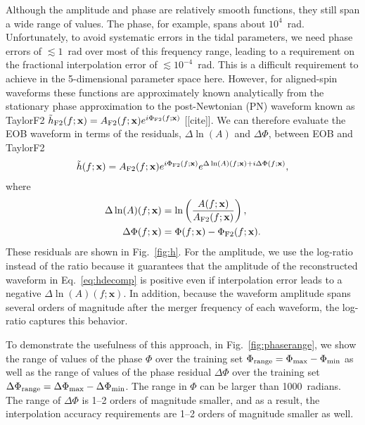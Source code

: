 \documentclass[prd,aps,letter,twocolumn,floatfix,notitlepage,nofootinbib]{revtex4-1}
\def\bx{\mathbf{x}}
\begin{document}
Although the amplitude and phase are relatively smooth functions, they still span a wide range of values. The phase, for example, spans about $10^4$~rad. Unfortunately, to avoid systematic errors in the tidal parameters, we need phase errors of $\lesssim 1$~rad over most of this frequency range, leading to a requirement on the fractional interpolation error of $\lesssim 10^{-4}$~rad. This is a difficult requirement to achieve in the 5-dimensional parameter space here. However, for aligned-spin waveforms these functions are approximately known analytically from the stationary phase approximation to the post-Newtonian (PN) waveform known as TaylorF2 $\tilde h_{\rm F2}(f; \bx) = A_{\rm F2}(f; \bx) e^{i\Phi_{\rm F2} (f; \bx)}$ [[cite]]. We can therefore evaluate the EOB waveform in terms of the residuals, $\Delta\ln(A)$ and $\Delta\Phi$, between EOB and TaylorF2
\begin{align}
\tilde h(f; \bx) = A_{\rm F2}(f; \bx) e^{i\Phi_{\rm F2}(f; \bx)} e^{\Delta\ln(A)(f; \bx) + i  \Delta\Phi(f; \bx)},
\label{eq:hdecomp}
\end{align}
where
\begin{align}
\Delta\ln(A)(f; \bx) &= \ln\left(\frac{ A(f; \bx) }{ A_{\rm F2}(f; \bx)}\right),\\
\Delta\Phi(f; \bx) & = \Phi(f; \bx) - \Phi_{\rm F2}(f; \bx).
\end{align}
These residuals are shown in Fig.~\ref{fig:h}. For the amplitude, we use the log-ratio instead of the ratio because it guarantees that the amplitude of the reconstructed waveform in Eq.~\eqref{eq:hdecomp} is positive even if interpolation error leads to a negative $\Delta\ln(A)(f; \bx)$. In addition, because the waveform amplitude spans several orders of magnitude after the merger frequency of each waveform, the log-ratio captures this behavior. 

To demonstrate the usefulness of this approach, in Fig.~\ref{fig:phaserange}, we show the range of values of the phase $\Phi$ over the training set $\Phi_{\rm range} = \Phi_{\rm max} - \Phi_{\rm min}$ as well as the range of values of the phase residual $\Delta\Phi$ over the training set $\Delta\Phi_{\rm range} = \Delta\Phi_{\rm max}-\Delta\Phi_{\rm min}$. The range in $\Phi$ can be larger than 1000~radians. The range of $\Delta\Phi$ is 1--2 orders of magnitude smaller, and as a result, the interpolation accuracy requirements are 1--2 orders of magnitude smaller as well. 
\end{document}
